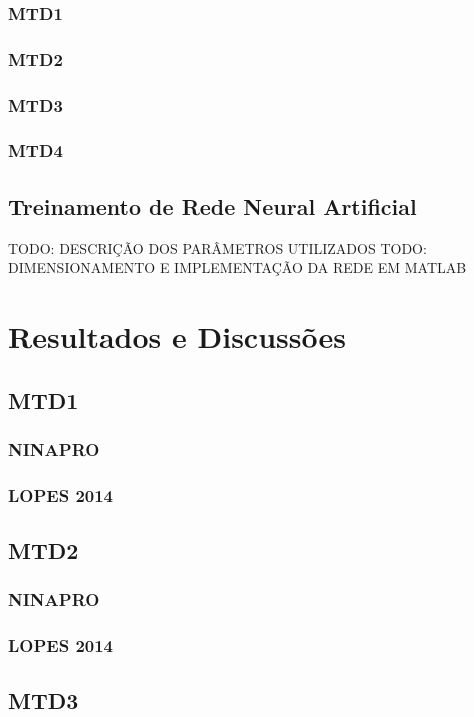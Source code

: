 \documentclass[
	12pt,				%
	openright,			%
	oneside,
	a4paper,			%
	english,			%
	francais,			%
	spanish,			%
	brazil				%
	]{abntex2}
\begin{document}
\subsection{MTD1}
\subsection{MTD2}
\subsection{MTD3}
\subsection{MTD4}

\section{Treinamento de Rede Neural Artificial}

	TODO: DESCRIÇÃO DOS PARÂMETROS UTILIZADOS
	TODO: DIMENSIONAMENTO E IMPLEMENTAÇÃO DA REDE EM MATLAB

\chapter{Resultados e Discussões}
\section{MTD1}
\subsection{NINAPRO}
\subsection{LOPES 2014}
\section{MTD2}
\subsection{NINAPRO}
\subsection{LOPES 2014}
\section{MTD3}
\end{document}

